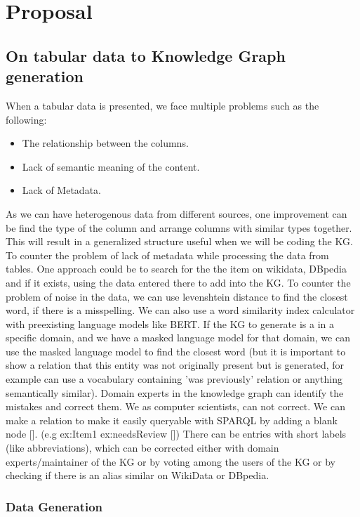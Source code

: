\documentclass[runningheads]{llncs}
\begin{document}
\section{Proposal}
\subsection{On tabular data to Knowledge Graph generation}

When a tabular data is presented, we face multiple problems such as the following:
\begin{itemize}
    \item The relationship between the columns.
    \item Lack of semantic meaning of the content.
    \item Lack of Metadata.
\end{itemize}

As we can have heterogenous data from different sources, one improvement can be find the type of the column and arrange columns with similar types together.
This will result in a generalized structure useful when we will be coding the KG. 
To counter the problem of lack of metadata while processing the data from tables. One approach could be to search for the the item on wikidata, DBpedia and if 
it exists, using the data entered there to add into the KG.
To counter the problem of noise in the data, we can use levenshtein distance to find the closest word, if there is a misspelling. We can also 
use a word similarity index calculator with preexisting language models like BERT. If the KG to generate is a in a specific domain, and we have a 
masked language model for that domain, we can use the masked language model to find the closest word (but it is important to show a relation that this entity 
was not originally present but is generated, for example can use a vocabulary containing 'was previously' relation or anything semantically similar).
Domain experts in the knowledge graph can identify the mistakes and correct them. We as computer scientists, can not correct. We can make a relation
to make it easily queryable with SPARQL by adding a blank node []. (e.g ex:Item1 ex:needsReview [])
There can be entries with short labels (like abbreviations), which can be corrected either with domain experts/maintainer of the KG or by voting among the users of the KG 
or by checking if there is an alias similar on WikiData or DBpedia.

\subsubsection*{Data Generation}
\end{document}
